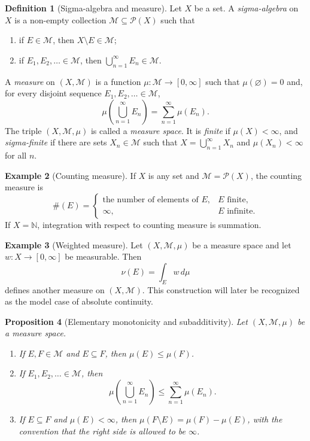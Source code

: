 \documentclass[11pt,openany]{book}
\numberwithin{equation}{chapter}
\theoremstyle{definition}
\newtheorem{definition}{Definition}[chapter]
\newtheorem{example}[definition]{Example}
\theoremstyle{plain}
\newtheorem{proposition}[definition]{Proposition}
\theoremstyle{remark}
\newcommand{\N}{\mathbb{N}}
\newcommand{\M}{\mathcal{M}}
\newcommand{\1}{\mathbf{1}}
\newcommand{\dd}{\,d}
\begin{document}
\begin{definition}[Sigma-algebra and measure]
Let \(X\) be a set. A \emph{sigma-algebra} on \(X\) is a non-empty collection \(\M\subseteq \mathcal P(X)\) such that
\begin{enumerate}[label=\textup{(\roman*)}]
  \item if \(E\in\M\), then \(X\setminus E\in\M\);
  \item if \(E_1,E_2,\ldots\in\M\), then \(\bigcup_{n=1}^{\infty}E_n\in\M\).
\end{enumerate}
A \emph{measure} on \((X,\M)\) is a function \(\mu:\M\to[0,\infty]\) such that \(\mu(\varnothing)=0\) and, for every disjoint sequence \(E_1,E_2,\ldots\in\M\),
\[
  \mu\left(\bigcup_{n=1}^{\infty}E_n\right)=\sum_{n=1}^{\infty}\mu(E_n).
\]
The triple \((X,\M,\mu)\) is called a \emph{measure space}. It is \emph{finite} if \(\mu(X)<\infty\), and \emph{sigma-finite} if there are sets \(X_n\in\M\) such that \(X=\bigcup_{n=1}^{\infty}X_n\) and \(\mu(X_n)<\infty\) for all \(n\).
\end{definition}

\begin{example}[Counting measure]
If \(X\) is any set and \(\M=\mathcal P(X)\), the counting measure is
\[
  \#(E)=\begin{cases}
  \text{the number of elements of }E, & E\text{ finite},\\
  \infty, & E\text{ infinite}.
  \end{cases}
\]
If \(X=\N\), integration with respect to counting measure is summation.
\end{example}

\begin{example}[Weighted measure]
Let \((X,
\M,\mu)\) be a measure space and let \(w:X\to[0,\infty]\) be measurable. Then
\[
  \nu(E)=\int_E w\dd\mu
\]
defines another measure on \((X,\M)\). This construction will later be recognized as the model case of absolute continuity.
\end{example}

\begin{proposition}[Elementary monotonicity and subadditivity]
Let \((X,\M,\mu)\) be a measure space.
\begin{enumerate}[label=\textup{(\roman*)}]
  \item If \(E,F\in\M\) and \(E\subseteq F\), then \(\mu(E)\leq \mu(F)\).
  \item If \(E_1,E_2,\ldots\in\M\), then
  \[
    \mu\left(\bigcup_{n=1}^{\infty}E_n\right)\leq \sum_{n=1}^{\infty}\mu(E_n).
  \]
  \item If \(E\subseteq F\) and \(\mu(E)<\infty\), then \(\mu(F\setminus E)=\mu(F)-\mu(E)\), with the convention that the right side is allowed to be \(\infty\).
\end{enumerate}
\end{proposition}
\end{document}
